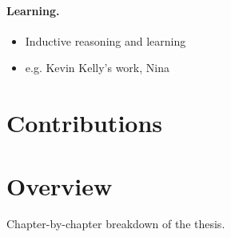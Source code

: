\paragraph{Learning.}

\begin{notes}
    \begin{itemize}
        \item Inductive reasoning and learning
        \item e.g. Kevin Kelly's work, Nina
    \end{itemize}
\end{notes}

\section{Contributions}


\section{Overview}

\begin{notes}
    Chapter-by-chapter breakdown of the thesis.
\end{notes}
